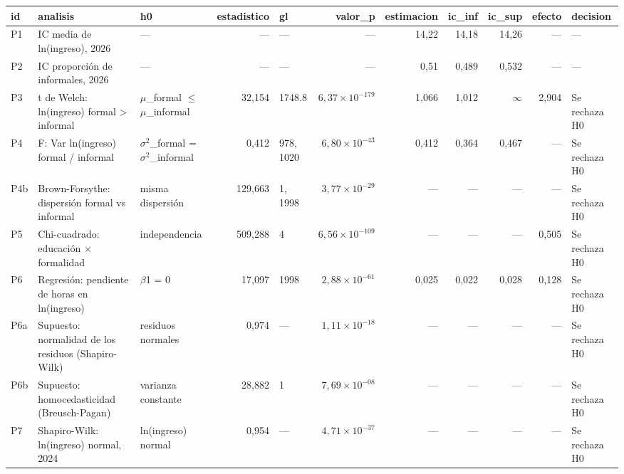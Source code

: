 \begin{tabular}{lllrlrrrrrl}
\toprule
id & analisis & h0 & estadistico & gl & valor\_p & estimacion & ic\_inf & ic\_sup & efecto & decision \\
\midrule
P1 & IC media de ln(ingreso), 2026 & — & — & — & — & 14,22 & 14,18 & 14,26 & — & — \\
P2 & IC proporción de informales, 2026 & — & — & — & — & 0,51 & 0,489 & 0,532 & — & — \\
P3 & t de Welch: ln(ingreso) formal > informal & $\mu$\_formal $\leq$ $\mu$\_informal & 32,154 & 1748.8 & $6,37 \times 10^{-179}$ & 1,066 & 1,012 & $\infty$ & 2,904 & Se rechaza H0 \\
P4 & F: Var ln(ingreso) formal / informal & $\sigma^2$\_formal = $\sigma^2$\_informal & 0,412 & 978, 1020 & $6,80 \times 10^{-43}$ & 0,412 & 0,364 & 0,467 & — & Se rechaza H0 \\
P4b & Brown-Forsythe: dispersión formal vs informal & misma dispersión & 129,663 & 1, 1998 & $3,77 \times 10^{-29}$ & — & — & — & — & Se rechaza H0 \\
P5 & Chi-cuadrado: educación $\times$ formalidad & independencia & 509,288 & 4 & $6,56 \times 10^{-109}$ & — & — & — & 0,505 & Se rechaza H0 \\
P6 & Regresión: pendiente de horas en ln(ingreso) & $\beta$1 = 0 & 17,097 & 1998 & $2,88 \times 10^{-61}$ & 0,025 & 0,022 & 0,028 & 0,128 & Se rechaza H0 \\
P6a & Supuesto: normalidad de los residuos (Shapiro-Wilk) & residuos normales & 0,974 & — & $1,11 \times 10^{-18}$ & — & — & — & — & Se rechaza H0 \\
P6b & Supuesto: homocedasticidad (Breusch-Pagan) & varianza constante & 28,882 & 1 & $7,69 \times 10^{-08}$ & — & — & — & — & Se rechaza H0 \\
P7 & Shapiro-Wilk: ln(ingreso) normal, 2024 & ln(ingreso) normal & 0,954 & — & $4,71 \times 10^{-37}$ & — & — & — & — & Se rechaza H0 \\
\bottomrule
\end{tabular}
